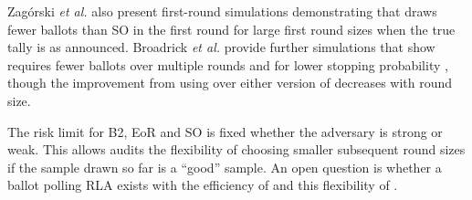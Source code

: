 
Zag\'{o}rski {\em et al.}  also present first-round simulations demonstrating that \Minerva draws fewer ballots than SO \BRAVO in the first round for large first round sizes when the true tally is as announced. 
Broadrick {\em et al.} provide further simulations that show \Minerva requires fewer ballots over multiple rounds and for lower stopping probability \cite{simulations}, though the improvement from using \Minerva over either version of \BRAVO decreases with round size. 

The risk limit for B2, EoR and SO \BRAVO is fixed whether the adversary is strong or weak. This allows \BRAVO audits the flexibility of choosing smaller subsequent round sizes if the sample drawn so far is a ``good'' sample. An open question is whether a ballot polling RLA exists with the efficiency of \Minerva and this flexibility of \BRAVO.

